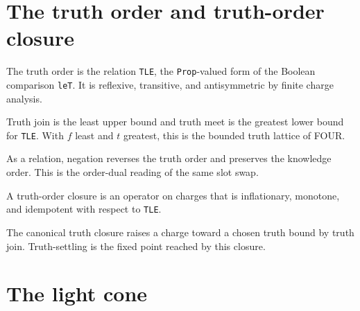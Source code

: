 \section{The truth order and truth-order closure}

\begin{proposition}\label{thm:tle}\leanok{}
The truth order is the relation \texttt{TLE}, the \texttt{Prop}-valued form
of the Boolean comparison \texttt{leT}. It is reflexive, transitive, and
antisymmetric by finite charge analysis.
\end{proposition}

\begin{theorem}\label{thm:truth-lattice}\leanok{}
Truth join is the least upper bound and truth meet is the greatest lower
bound for \texttt{TLE}. With $f$ least and $t$ greatest, this is the bounded
truth lattice of FOUR.
\end{theorem}

\begin{theorem}\label{thm:negate-tle}\leanok{}
As a relation, negation reverses the truth order and preserves the knowledge
order. This is the order-dual reading of the same slot swap.
\end{theorem}

\begin{proposition}\label{thm:tclosure}\leanok{}
A truth-order closure is an operator on charges that is inflationary,
monotone, and idempotent with respect to \texttt{TLE}.
\end{proposition}

\begin{proposition}\label{thm:settleT}\leanok{}
The canonical truth closure raises a charge toward a chosen truth bound by
truth join. Truth-settling is the fixed point reached by this closure.
\end{proposition}

\section{The light cone}

